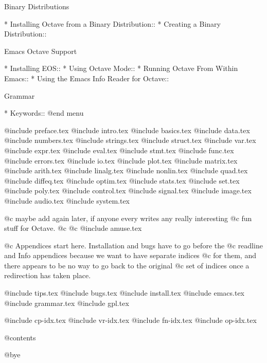 Binary Distributions

* Installing Octave from a Binary Distribution::  
* Creating a Binary Distribution::  

Emacs Octave Support

* Installing EOS::              
* Using Octave Mode::           
* Running Octave From Within Emacs::  
* Using the Emacs Info Reader for Octave::  

Grammar

* Keywords::                    
@end menu

@include preface.tex
@include intro.tex
@include basics.tex
@include data.tex
@include numbers.tex
@include strings.tex
@include struct.tex
@include var.tex
@include expr.tex
@include eval.tex
@include stmt.tex
@include func.tex
@include errors.tex
@include io.tex
@include plot.tex
@include matrix.tex
@include arith.tex
@include linalg.tex
@include nonlin.tex
@include quad.tex
@include diffeq.tex
@include optim.tex
@include stats.tex
@include set.tex
@include poly.tex
@include control.tex
@include signal.tex
@include image.tex
@include audio.tex
@include system.tex

@c maybe add again later, if anyone every writes any really interesting
@c fun stuff for Octave.
@c
@c @include amuse.tex

@c Appendices start here.  Installation and bugs have to go before the
@c readline and Info appendices because we want to have separate indices
@c for them, and there appears to be no way to go back to the original
@c set of indices once a redirection has taken place.

@include tips.tex
@include bugs.tex
@include install.tex
@include emacs.tex
@include grammar.tex
@include gpl.tex

@include cp-idx.tex
@include vr-idx.tex
@include fn-idx.tex
@include op-idx.tex

@contents

@bye
